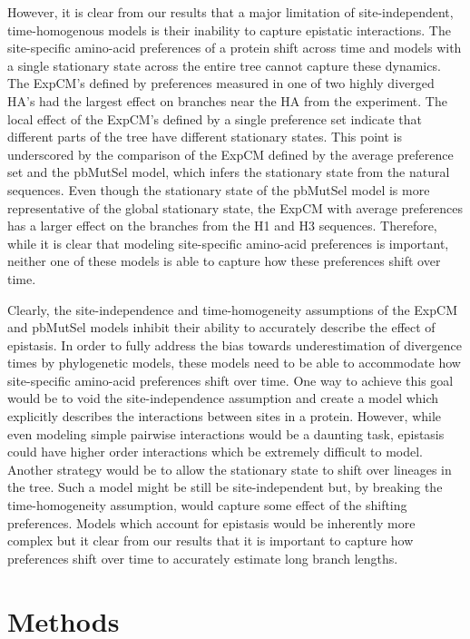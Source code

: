 \documentclass[11pt]{article}
\begin{document}
However, it is clear from our results that a major limitation of site-independent, time-homogenous models is their inability to capture epistatic interactions. 
The site-specific amino-acid preferences of a protein shift across time and models with a single stationary state across the entire tree cannot capture these dynamics. 
The ExpCM's defined by preferences measured in one of two highly diverged HA's had the largest effect on branches near the HA from the experiment. 
The local effect of the ExpCM's defined by a single preference set indicate that different parts of the tree have different stationary states. 
This point is underscored by the comparison of the ExpCM defined by the average preference set and the pbMutSel model, which infers the stationary state from the natural sequences. 
Even though the stationary state of the pbMutSel model is more representative of the global stationary state, the ExpCM with average preferences has a larger effect on the branches from the H1 and H3 sequences. 
Therefore, while it is clear that modeling site-specific amino-acid preferences is important, neither one of these models is able to capture how these preferences shift over time.

Clearly, the site-independence and time-homogeneity assumptions of the ExpCM and pbMutSel models inhibit their ability to accurately describe the effect of epistasis.
In order to fully address the bias towards underestimation of divergence times by phylogenetic models, these models need to be able to accommodate how site-specific amino-acid preferences shift over time. 
One way to achieve this goal would be to void the site-independence assumption and create a model which explicitly describes the interactions between sites in a protein. 
However, while even modeling simple pairwise interactions would be a daunting task, epistasis could have higher order interactions which be extremely difficult to model. 
Another strategy would be to allow the stationary state to shift over lineages in the tree. 
Such a model might be still be site-independent but, by breaking the time-homogeneity assumption, would capture some effect of the shifting preferences. 
Models which account for epistasis would be inherently more complex but it clear from our results that it is important to capture how preferences shift over time to accurately estimate long branch lengths.

\section*{Methods}
\end{document}
